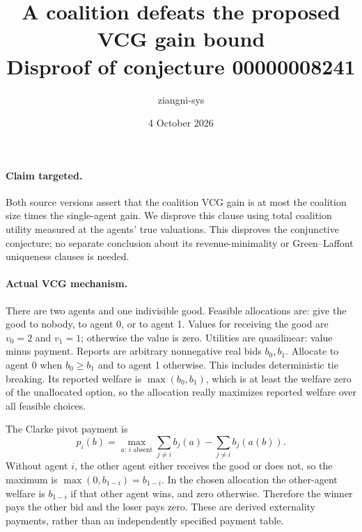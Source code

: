 \documentclass[11pt]{article}
\title{A coalition defeats the proposed VCG gain bound\\Disproof of conjecture 00000008241}
\author{ziangni-sys}
\date{4 October 2026}
\begin{document}
\maketitle
\paragraph{Claim targeted.}
Both source versions assert that the coalition VCG gain is at most the coalition size times the single-agent gain. We disprove this clause using total coalition utility measured at the agents' true valuations. This disproves the conjunctive conjecture; no separate conclusion about its revenue-minimality or Green--Laffont uniqueness clauses is needed.

\paragraph{Actual VCG mechanism.}
There are two agents and one indivisible good. Feasible allocations are: give the good to nobody, to agent 0, or to agent 1. Values for receiving the good are $v_0=2$ and $v_1=1$; otherwise the value is zero. Utilities are quasilinear: value minus payment. Reports are arbitrary nonnegative real bids $b_0,b_1$. Allocate to agent 0 when $b_0\ge b_1$ and to agent 1 otherwise. This includes deterministic tie breaking. Its reported welfare is $\max(b_0,b_1)$, which is at least the welfare zero of the unallocated option, so the allocation really maximizes reported welfare over all feasible choices.

The Clarke pivot payment is
\[
 p_i(b)=\max_{a:\,i\text{ absent}}\sum_{j\ne i}b_j(a)
             -\sum_{j\ne i}b_j(a(b)).
\]
Without agent $i$, the other agent either receives the good or does not, so the maximum is $\max(0,b_{1-i})=b_{1-i}$. In the chosen allocation the other-agent welfare is $b_{1-i}$ if that other agent wins, and zero otherwise. Therefore the winner pays the other bid and the loser pays zero. These are derived externality payments, rather than an independently specified payment table.
\end{document}
